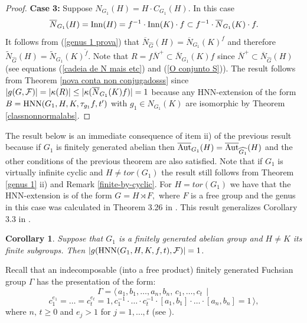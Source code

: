 \documentclass[a4paper,12pt]{article}
\newtheorem{cor}[thm]{Corollary}
\newcommand{\F}{{\cal F}}
\def\aut {{\rm Aut}}
\def\inn {{\rm Inn}}
\def\hnn {{\rm HNN}}
\begin{document}
{\begin{proof}
\textbf{Case 3:} Suppose $N_{G_1}(H)=H \cdot C_{G_1}(H).$ In this case $$\overline{N}_{G_1}(H)=\inn(H)=f^{-1}\cdot \inn(K) \cdot f\subset f^{-1} \cdot \overline{N}_{G_1}(K) \cdot f.$$ It follows from (\ref{genus 1 prova}) that $\overline{N}_{\widehat G}(H)=\overline{N}_{G_1}(K)^{ f}$ and therefore $\widetilde{N}_{\widehat G}(H)=\widetilde{N}_{G_1}(K)^{\tilde f}.$ Note that $R=f\overline{N}^+\subset \overline{N}_{ G_1}(K)f$ since $\overline{N}^+\subset \overline{N}_{\widehat G}(H)$ (see equations (\ref{cadeia de N mais etc}) and  (\ref{O conjunto S})). The result follows from Theorem \ref{nova conta non conjugadosss} since $|g(G, \F)|=|\kappa(R)| \leq |\kappa(\overline{N}_{ G_1}(K)f)|=1$ because any HNN-extension of the form $B=\hnn(G_1, H,\\ K, \tau_{g_1}f, t')$ with $g_1 \in N_{G_1}(K)$ are isomorphic by Theorem \ref{classnonnormalabs}. 
\end{proof}



The result below is an immediate consequence of item ii) of the previous result because if $G_1$ is finitely generated abelian then $\overline{\aut}_{G_1}(H)=\overline{\aut}_{\widehat{G_1}}(H)$ and the other conditions of the previous theorem are also satisfied. Note that if $G_1$ is virtually infinite cyclic and $H \neq tor(G_1)$ the result still follows from Theorem \ref{genus 1} ii) and Remark  \ref{finite-by-cyclic}. For $H=tor(G_1)$ we have that the HNN-extension is of the form $G=H \rtimes F,$ where $F$ is a free group and the genus in this case was calculated in Theorem 3.26 in \cite{GZ}. This result generalizes Corollary 3.3 in \cite{BZ}.

\begin{cor} \label{fin ger abelian} Suppose that $G_1$ is a finitely generated abelian group and $H\neq K$ its finite subgroups. Then
 $|g(\hnn(G_1, H, K, f, t), \mathcal{F})|=1$.  
\end{cor}

Recall that an indecomposable (into a free product) finitely generated Fuchsian group $\Gamma$ has the presentation of
the form: 
$$
\Gamma=\langle\,a_1,b_1,\ldots,a_n, b_n,\, c_1,\ldots, c_t\, \mid$$
$$ c_1^{e_1}=\ldots=
c_t^{e_t}=1,c_1^{-1}\cdot\ldots \cdot
c_t^{-1}\cdot[a_1,b_1]\cdot\ldots\cdot [a_n,b_n]=1 \, \rangle,$$  where $n,\,
t\geq 0$ and $e_j>1$ for $j=1,\ldots, t$ (see \cite{newman}).

}
\end{document}
